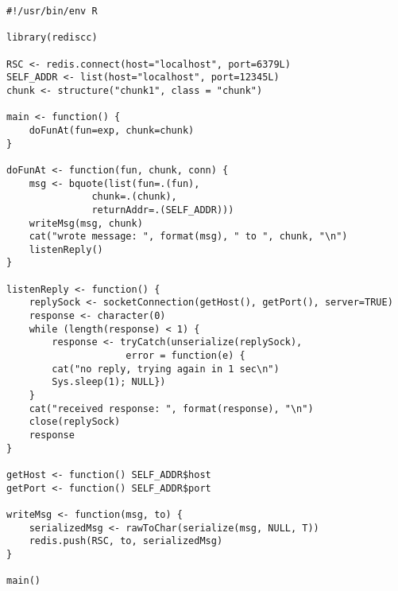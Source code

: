 \hypertarget{lst:vr-client}{%
\label{lst:vr-client}}%
\begin{verbatim}
#!/usr/bin/env R

library(rediscc)

RSC <- redis.connect(host="localhost", port=6379L)
SELF_ADDR <- list(host="localhost", port=12345L)
chunk <- structure("chunk1", class = "chunk")

main <- function() {
    doFunAt(fun=exp, chunk=chunk)
}

doFunAt <- function(fun, chunk, conn) {
    msg <- bquote(list(fun=.(fun),
               chunk=.(chunk),
               returnAddr=.(SELF_ADDR)))
    writeMsg(msg, chunk)
    cat("wrote message: ", format(msg), " to ", chunk, "\n")
    listenReply()
}

listenReply <- function() {
    replySock <- socketConnection(getHost(), getPort(), server=TRUE)
    response <- character(0)
    while (length(response) < 1) {
        response <- tryCatch(unserialize(replySock),
                     error = function(e) {
        cat("no reply, trying again in 1 sec\n")
        Sys.sleep(1); NULL})
    }
    cat("received response: ", format(response), "\n")
    close(replySock)
    response
}

getHost <- function() SELF_ADDR$host
getPort <- function() SELF_ADDR$port

writeMsg <- function(msg, to) {
    serializedMsg <- rawToChar(serialize(msg, NULL, T))
    redis.push(RSC, to, serializedMsg)
}

main()
\end{verbatim}

